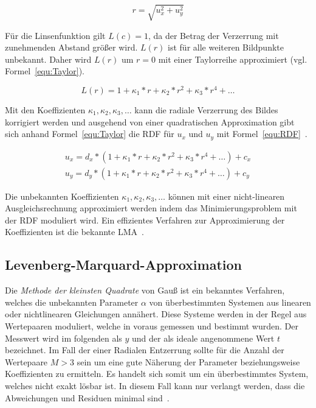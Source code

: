 \begin{equation}
\label{equ:Abstand}
r = \sqrt{u_x^2+u_y^2}
\end{equation}

 Für die Linsenfunktion gilt $L(c)=1$, da der Betrag der Verzerrung mit zunehmenden Abstand größer wird. $L(r)$ ist für alle weiteren Bildpunkte unbekannt. Daher wird $L(r)$ um $r=0$ mit einer Taylorreihe approximiert (vgl. Formel~\ref{equ:Taylor}). 
 
 \begin{equation}
 \label{equ:Taylor}
 L(r)=1+\kappa_1*r+\kappa_2*r^2+\kappa_3*r^4 + \dots
 \end{equation}

Mit den Koeffizienten $\kappa_1, \kappa_2, \kappa_3, \dots$ kann die radiale Verzerrung des Bildes korrigiert werden und ausgehend von einer quadratischen Approximation gibt sich anhand Formel~\ref{equ:Taylor} die RDF für $u_x$ und $u_y$ mit Formel~\ref{equ:RDF}~\cite{WangRaddist}.

\begin{equation}
\label{equ:RDF}
\begin{split}
u_x = d_x*(1+\kappa_1*r+\kappa_2*r^2+\kappa_3*r^4 + \dots) + c_x\\
u_y = d_y*(1+\kappa_1*r+\kappa_2*r^2+\kappa_3*r^4 + \dots) + c_y
\end{split}
\end{equation}

Die unbekannten Koeffizienten $\kappa_1, \kappa_2, \kappa_3, \dots$ können mit einer nicht-linearen Ausgleichsrechnung approximiert werden indem das Minimierungsproblem mit der RDF moduliert wird. Ein effizientes Verfahren zur Approximierung der Koeffizienten ist die bekannte LMA~\cite{LevMarquardt}.
\subsection{Levenberg-Marquard-Approximation}
Die \textit{Methode der kleinsten Quadrate} von Gauß ist ein bekanntes Verfahren, welches die unbekannten Parameter $\alpha$ von überbestimmten Systemen aus linearen oder nichtlinearen Gleichungen annähert. Diese Systeme werden in der Regel aus Wertepaaren moduliert, welche in voraus gemessen und bestimmt wurden. Der Messwert wird im folgenden als $y$ und der als ideale angenommene Wert $t$ bezeichnet.
Im Fall der einer Radialen Entzerrung sollte für die Anzahl der Wertepaare $M>3$ sein um eine gute Näherung der Parameter beziehungsweise Koeffizienten zu ermitteln.
Es handelt sich somit um ein überbestimmtes System, welches nicht exakt lösbar ist. In diesem Fall kann nur verlangt werden, dass die Abweichungen und Residuen minimal sind~\cite{schwarz2011numerische}. 

